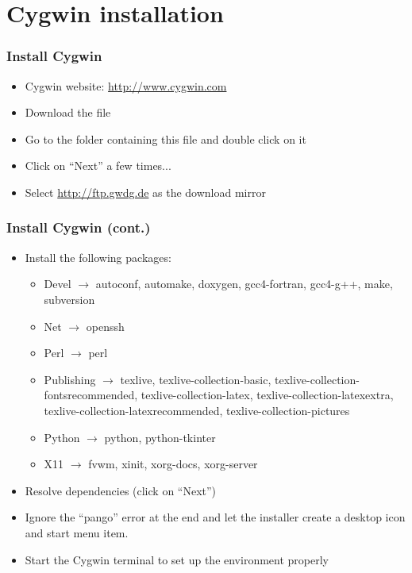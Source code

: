 \section{Cygwin installation}

\begin{frame}
    \frametitle{Install Cygwin}
    \windowsframe

    \begin{itemize}
        \item Cygwin website: \url{http://www.cygwin.com}
        \item Download the  file
        \item Go to the folder containing this file and double click on it
        \item Click on \enquote{Next} a few times...
        \item Select \url{http://ftp.gwdg.de} as the download mirror
    \end{itemize}
\end{frame}

\begin{frame}
    \frametitle{Install Cygwin (cont.)}
    \windowsframe

    \begin{itemize}
        \item Install the following packages:
            \begin{itemize}
                \item Devel $\rightarrow$ autoconf, automake, doxygen,
                    gcc4-fortran, gcc4-g++, make, subversion
                \item Net $\rightarrow$ openssh
                \item Perl $\rightarrow$ perl
                \item Publishing $\rightarrow$ texlive,
                    texlive-collection-basic,
                    texlive-collection-fontsrecommended,
                    texlive-collection-latex,
                    texlive-collection-latexextra,
                    texlive-collection-latexrecommended,
                    texlive-collection-pictures
                \item Python $\rightarrow$ python, python-tkinter
                \item X11 $\rightarrow$ fvwm, xinit, xorg-docs, xorg-server
            \end{itemize}
        \item Resolve dependencies (click on \enquote{Next})
        \item Ignore the \enquote{pango} error at the end and let the
            installer create a desktop icon and start menu item.
        \item Start the Cygwin terminal to set up the environment properly
    \end{itemize}
\end{frame}

